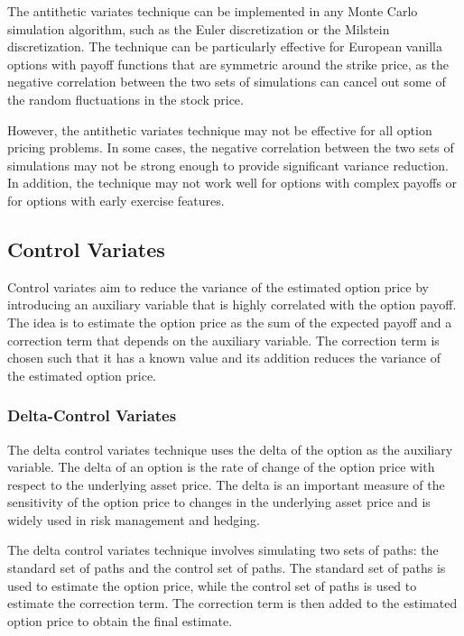 \documentclass[11pt, a4paper, leqno]{article}
\begin{document}
The antithetic variates technique can be implemented in any Monte Carlo simulation algorithm, such as the Euler discretization or the Milstein discretization. The technique can be particularly effective for European vanilla options with payoff functions that are symmetric around the strike price, as the negative correlation between the two sets of simulations can cancel out some of the random fluctuations in the stock price.

However, the antithetic variates technique may not be effective for all option pricing problems. In some cases, the negative correlation between the two sets of simulations may not be strong enough to provide significant variance reduction. In addition, the technique may not work well for options with complex payoffs or for options with early exercise features.

\subsection{Control Variates}

Control variates aim to reduce the variance of the estimated option price by introducing an auxiliary variable that is highly correlated with the option payoff. The idea is to estimate the option price as the sum of the expected payoff and a correction term that depends on the auxiliary variable. The correction term is chosen such that it has a known value and its addition reduces the variance of the estimated option price.

\subsubsection{Delta-Control Variates}

The delta control variates technique uses the delta of the option as the auxiliary variable. The delta of an option is the rate of change of the option price with respect to the underlying asset price. The delta is an important measure of the sensitivity of the option price to changes in the underlying asset price and is widely used in risk management and hedging.

The delta control variates technique involves simulating two sets of paths: the standard set of paths and the control set of paths. The standard set of paths is used to estimate the option price, while the control set of paths is used to estimate the correction term. The correction term is then added to the estimated option price to obtain the final estimate.
\end{document}
